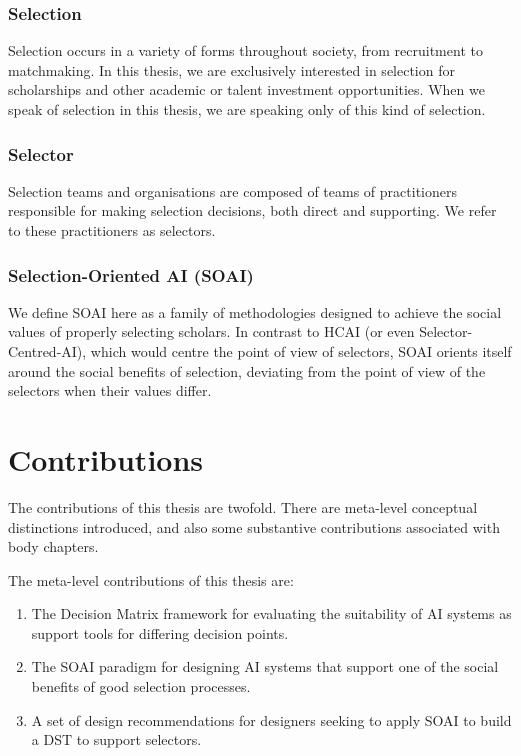 \subsubsection{Selection}
Selection occurs in a variety of forms throughout society, from recruitment to matchmaking. In this thesis, we are exclusively interested in selection for scholarships and other academic or talent investment opportunities. When we speak of selection in this thesis, we are speaking only of this kind of selection.

\subsubsection{Selector}
Selection teams and organisations are composed of teams of practitioners responsible for making selection decisions, both direct and supporting. We refer to these practitioners as selectors.

\subsubsection{Selection-Oriented AI (SOAI)} 
We define SOAI here as a family of methodologies designed to achieve the social values of properly selecting scholars. In contrast to HCAI (or even Selector-Centred-AI), which would centre the point of view of selectors, SOAI orients itself around the social benefits of selection, deviating from the point of view of the selectors when their values differ.

\section{Contributions} 
The contributions of this thesis are twofold. There are meta-level conceptual distinctions introduced, and also some substantive contributions associated with body chapters.

The meta-level contributions of this thesis are:

\begin{enumerate}
    \item The Decision Matrix framework for evaluating the suitability of AI systems as support tools for differing decision points.
    \item The SOAI paradigm for designing AI systems that support one of the social benefits of good selection processes.
    \item A set of design recommendations for designers seeking to apply SOAI to build a DST to support selectors.
\end{enumerate}

